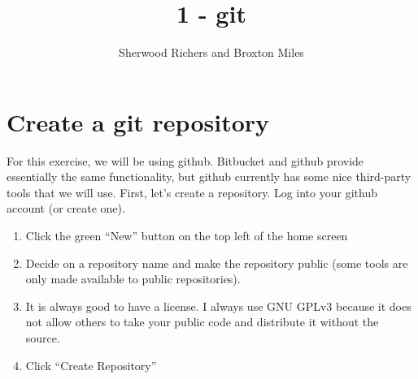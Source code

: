 \documentclass{article}
\begin{document}
\title{1 - git}
\author{Sherwood Richers and Broxton Miles}

\maketitle

\section{Create a git repository}
For this exercise, we will be using github. Bitbucket and github provide essentially the same functionality, but github currently has some nice third-party tools that we will use. First, let's create a repository. Log into your github account (or create one).
\begin{enumerate}
\item Click the green ``New'' button on the top left of the home screen
\item Decide on a repository name and make the repository public (some tools are only made available to public repositories).
\item It is always good to have a license. I always use GNU GPLv3 because it does not allow others to take your public code and distribute it without the source.
\item Click ``Create Repository''
\end{enumerate}
\end{document}
